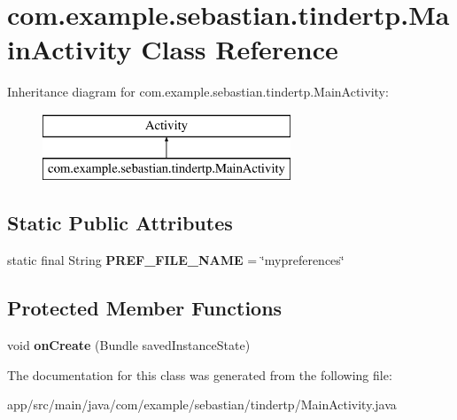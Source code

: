 \hypertarget{classcom_1_1example_1_1sebastian_1_1tindertp_1_1MainActivity}{}\section{com.\+example.\+sebastian.\+tindertp.\+Main\+Activity Class Reference}
\label{classcom_1_1example_1_1sebastian_1_1tindertp_1_1MainActivity}
Inheritance diagram for com.\+example.\+sebastian.\+tindertp.\+Main\+Activity\+:\begin{figure}[H]
\begin{center}
\leavevmode
\includegraphics[height=2.000000cm]{classcom_1_1example_1_1sebastian_1_1tindertp_1_1MainActivity}
\end{center}
\end{figure}
\subsection*{Static Public Attributes}
\begin{DoxyCompactItemize}
\item 
static final String {\bfseries P\+R\+E\+F\+\_\+\+F\+I\+L\+E\+\_\+\+N\+A\+ME} = \char`\"{}mypreferences\char`\"{}\hypertarget{classcom_1_1example_1_1sebastian_1_1tindertp_1_1MainActivity_a412a8b37497a9405a01a303733fdd167}{}\label{classcom_1_1example_1_1sebastian_1_1tindertp_1_1MainActivity_a412a8b37497a9405a01a303733fdd167}

\end{DoxyCompactItemize}
\subsection*{Protected Member Functions}
\begin{DoxyCompactItemize}
\item 
void {\bfseries on\+Create} (Bundle saved\+Instance\+State)\hypertarget{classcom_1_1example_1_1sebastian_1_1tindertp_1_1MainActivity_a2d817b83c55535264e02e3dcc4e50b87}{}\label{classcom_1_1example_1_1sebastian_1_1tindertp_1_1MainActivity_a2d817b83c55535264e02e3dcc4e50b87}

\end{DoxyCompactItemize}


The documentation for this class was generated from the following file\+:\begin{DoxyCompactItemize}
\item 
app/src/main/java/com/example/sebastian/tindertp/Main\+Activity.\+java\end{DoxyCompactItemize}
